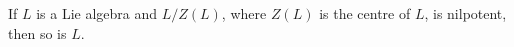 If $L$ is a Lie algebra and $L/Z(L)$, where $Z(L)$ is the centre of $L$, is nilpotent,
then so is $L$.
